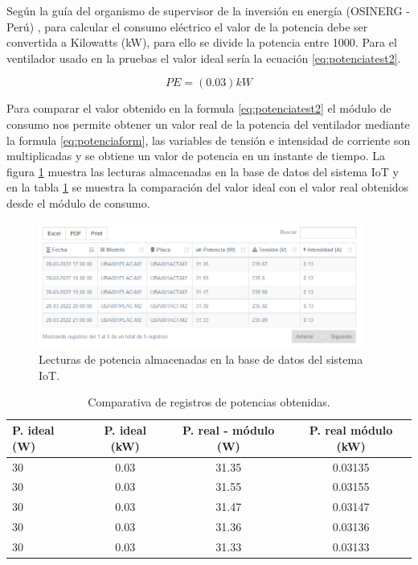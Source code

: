 Según la guía del organismo de supervisor de la inversión en energía (OSINERG - Perú) \citep{BOOK:3}, para calcular el consumo eléctrico el valor de la potencia  debe ser convertida a Kilowatts (kW), para ello se divide la potencia entre 1000. Para el ventilador usado en la pruebas el valor ideal sería la ecuación \ref{eq:potenciatest2}.

\begin{equation}
	\label{eq:potenciatest2}
	PE = \left( 0.03 \right) kW
\end{equation}

Para comparar el valor obtenido en la formula \ref{eq:potenciatest2} el módulo de consumo nos permite obtener un valor real de la potencia del ventilador mediante la formula \ref{eq:potenciaform}, las variables de tensión e intensidad de corriente son multiplicadas y se obtiene un valor de potencia en un instante de tiempo. La figura \ref{fig:registroPotencia} muestra las lecturas almacenadas en la base de datos del sistema IoT y en la tabla \ref{tab:tablapotencias} se muestra la comparación del valor ideal con el valor real obtenidos desde el módulo de consumo.

\begin{figure}[htpb]
\centering 
\includegraphics[width=0.95\textwidth]{./Figures/test/consumo/lecturas.png}
\caption{Lecturas de potencia almacenadas en la base de datos del sistema IoT.}
\label{fig:registroPotencia}
\end{figure}


\begin{table}[h]
	\centering
	\caption[Comparativa de registros de potencias obtenidas]{Comparativa de registros de potencias obtenidas.}
	\begin{tabular}{l c c c}    
		\toprule
		\textbf{P. ideal (W)} 	 & \textbf{P. ideal (kW)}  & \textbf{P. real - módulo (W)} &\textbf{P. real módulo (kW)} \\
		\midrule
		30 & 0.03 & 31.35 & 0.03135\\		
		30& 0.03 & 31.55  &0.03155 \\
		30& 0.03 & 31.47 & 0.03147\\		
		30& 0.03 & 31.36 & 0.03136\\		
		30& 0.03 & 31.33 & 0.03133\\
		\bottomrule
		\hline
	\end{tabular}
	\label{tab:tablapotencias}
\end{table}


